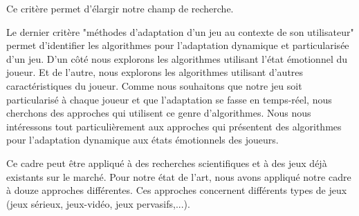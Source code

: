 \documentclass{article}
\begin{document}
		Ce critère permet d'élargir notre champ de recherche.\par
		Le dernier critère "méthodes d'adaptation d'un jeu au contexte de son utilisateur" permet d'identifier les algorithmes pour l'adaptation dynamique et particularisée d'un jeu.
		D'un côté nous explorons les algorithmes utilisant l'état émotionnel du joueur.
		Et de l'autre, nous explorons les algorithmes utilisant d'autres caractéristiques du joueur.
		Comme nous souhaitons que notre jeu soit particularisé à chaque joueur et que l'adaptation se fasse en temps-réel, nous cherchons des approches qui utilisent ce genre d'algorithmes.
		Nous nous intéressons tout particulièrement aux approches qui présentent des algorithmes pour l'adaptation dynamique aux états émotionnels des joueurs.\par
		Ce cadre peut être appliqué à des recherches scientifiques et à des jeux déjà existants sur le marché. 
		Pour notre état de l'art, nous avons appliqué notre cadre à douze approches différentes. 
		Ces approches concernent différents types de jeux (jeux sérieux, jeux-vidéo, jeux pervasifs,...).
\end{document}
